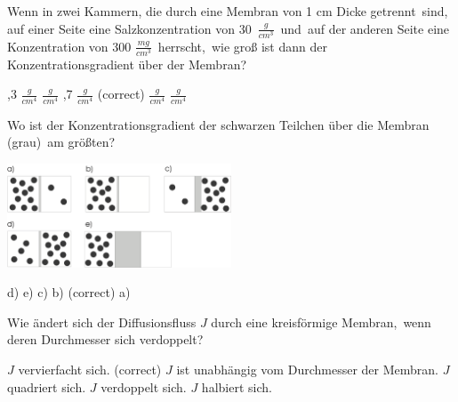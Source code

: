 \documentclass[11pt]{exam}
\begin{document}
\setlength{\voffset}{-0.5in}
\setlength{\headsep}{5pt}

\hspace{2mm}
 \hspace{5mm}
\vspace{4mm}

\begin{questions}

\question Wenn in zwei Kammern, die durch eine Membran von 1 cm Dicke getrennt sind, auf einer Seite eine Salzkonzentration von 30 \( \frac{g}{cm^3} \) und auf der anderen Seite eine Konzentration von 300 \( \frac{mg}{cm^3} \) herrscht, wie groß ist dann der Konzentrationsgradient über der Membran?

\begin{choices}
	,3 \( \frac{g}{cm^4} \)
	 \( \frac{g}{cm^4} \)
	,7 \( \frac{g}{cm^4} \) (correct)
	 \( \frac{g}{cm^4} \)
	 \( \frac{g}{cm^4} \)
\end{choices}

\vspace{3mm}\question Wo ist der Konzentrationsgradient der schwarzen Teilchen über die Membran (grau) am größten? 

\includegraphics[width=0.5\textwidth]{../../../questions/E/images/Diffusion.png}

\begin{choices}
	\choice d)
	\choice e)
	\choice c)
	\choice b) (correct)
	\choice a)
\end{choices}

\vspace{3mm}\question Wie ändert sich der Diffusionsfluss \( J \) durch eine kreisförmige Membran, wenn deren Durchmesser sich verdoppelt?

\begin{choices}
	\choice \( J \) vervierfacht sich. (correct)
	\choice \( J \) ist unabhängig vom Durchmesser der Membran.
	\choice \( J \) quadriert sich.
	\choice \( J \) verdoppelt sich.
	\choice \( J \) halbiert sich.
\end{choices}


\end{questions}
\end{document}
